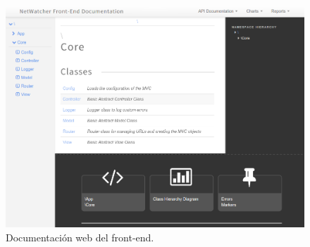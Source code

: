 \begin{figure}[!htp]
  \centering
  \includegraphics[width=\textwidth,clip=true]{graphics/capturas/docs_frontend}
  \caption{Documentación web del \gls{front-end}.}
  \label{fig:captura:docsfrontend}
\end{figure}
